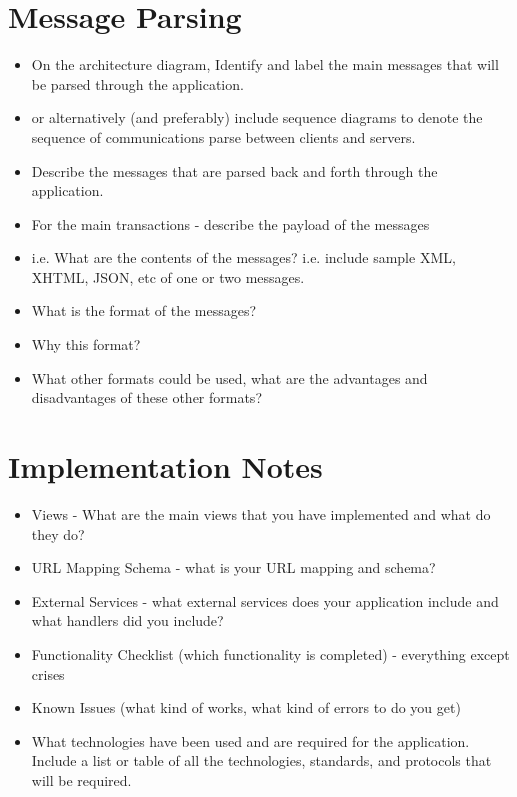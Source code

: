 \documentclass{sig-alt-release2}
\begin{document}
\section{Message Parsing}
\begin{itemize}

\item	On the architecture diagram, Identify and label the main messages that will be parsed through the application.
\item	or alternatively (and preferably) include sequence diagrams to denote the sequence of communications parse between clients and servers.

\item	Describe the messages that are parsed back and forth through the application.

\item	For the main transactions - describe the payload of the messages 
\item	i.e. What are the contents of the messages? i.e. include sample XML, XHTML, JSON, etc of one or two messages.

\item	What is the format of the messages? 

\item	Why this format? 

\item	What other formats could be used, what are the advantages and disadvantages of these other formats?
\end{itemize}


\section{Implementation Notes}

\begin{itemize}

\item Views - What are the main views that you have implemented and what do they do?



\item URL Mapping Schema - what is your URL mapping and schema?

\item External Services  - what external services does your application include and what handlers did you include?

\item	Functionality Checklist (which functionality is completed) - everything except crises 

\item	Known Issues (what kind of works, what kind of errors to do you get)

\item What technologies have been used and are required for the application. Include a list or table of all the technologies, standards, and protocols that will be required.
\end{itemize}
\end{document}
